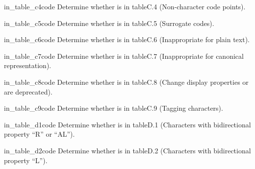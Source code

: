 \begin{funcdesc}{in_table_c4}{code}
Determine whether  is in table{C.4} 
(Non-character code points).
\end{funcdesc}

\begin{funcdesc}{in_table_c5}{code}
Determine whether  is in table{C.5} 
(Surrogate codes).
\end{funcdesc}

\begin{funcdesc}{in_table_c6}{code}
Determine whether  is in table{C.6} 
(Inappropriate for plain text).
\end{funcdesc}

\begin{funcdesc}{in_table_c7}{code}
Determine whether  is in table{C.7} 
(Inappropriate for canonical representation).
\end{funcdesc}

\begin{funcdesc}{in_table_c8}{code}
Determine whether  is in table{C.8} 
(Change display properties or are deprecated).
\end{funcdesc}

\begin{funcdesc}{in_table_c9}{code}
Determine whether  is in table{C.9} 
(Tagging characters).
\end{funcdesc}

\begin{funcdesc}{in_table_d1}{code}
Determine whether  is in table{D.1} 
(Characters with bidirectional property ``R'' or ``AL'').
\end{funcdesc}

\begin{funcdesc}{in_table_d2}{code}
Determine whether  is in table{D.2} 
(Characters with bidirectional property ``L'').
\end{funcdesc}

